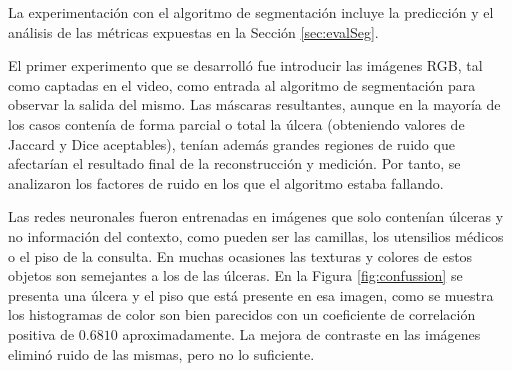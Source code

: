 La experimentación con el algoritmo de segmentación incluye la predicción y el análisis de las métricas expuestas en la Sección \ref{sec:evalSeg}. 

El primer experimento que se desarrolló fue introducir las imágenes RGB, tal como captadas en el video, como entrada al algoritmo de segmentación para observar la salida del mismo. Las máscaras resultantes, aunque en la mayoría de los casos contenía de forma parcial o total la úlcera (obteniendo valores de Jaccard y Dice aceptables), tenían además grandes regiones de ruido que afectarían el resultado final de la reconstrucción y medición. Por tanto, se analizaron los factores de ruido en los que el algoritmo estaba fallando. 

Las redes neuronales fueron entrenadas en imágenes que solo contenían úlceras y no información del contexto, como pueden ser las camillas, los utensilios médicos o el piso de la consulta. En muchas ocasiones las texturas y colores de estos objetos son semejantes a los de las úlceras. En la Figura \ref{fig:confussion} se presenta una úlcera y el piso que está presente en esa imagen, como se muestra los histogramas de color son bien parecidos con un coeficiente de correlación positiva de $0.6810$ aproximadamente. La mejora de contraste en las imágenes eliminó ruido de las mismas, pero no lo suficiente.

